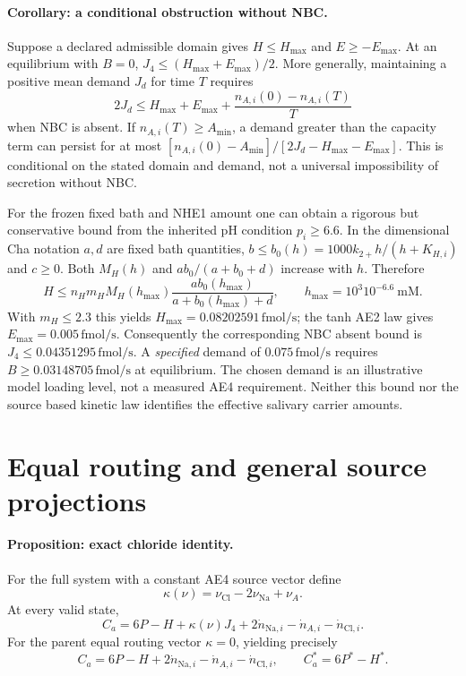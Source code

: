 \paragraph{Corollary: a conditional obstruction without NBC.}
Suppose a declared admissible domain gives $H\leq H_{\max}$ and
$E\geq-E_{\max}$.  At an equilibrium with $B=0$,
$J_4\leq(H_{\max}+E_{\max})/2$.  More generally, maintaining a positive
mean demand $J_d$ for time $T$ requires
\[
 2J_d\leq H_{\max}+E_{\max}
      +\frac{n_{A,i}(0)-n_{A,i}(T)}{T}
\]
when NBC is absent.  If $n_{A,i}(T)\geq A_{\min}$, a demand greater than
the capacity term can persist for at most
$[n_{A,i}(0)-A_{\min}]/[2J_d-H_{\max}-E_{\max}]$.
This is conditional on the stated domain and demand, not a universal
impossibility of secretion without NBC.

For the frozen fixed bath and NHE1 amount one can obtain a rigorous but
conservative bound from the inherited pH condition $p_i\geq6.6$.
In the dimensional Cha notation $a,d$ are fixed bath quantities,
$b\leq b_0(h)=1000k_{2+}h/(h+K_{H,i})$ and $c\geq0$.
Both $M_H(h)$ and $ab_0/(a+b_0+d)$ increase with $h$.
Therefore
\[
 H\leq n_Hm_H M_H(h_{\max})
      \frac{ab_0(h_{\max})}{a+b_0(h_{\max})+d},
 \qquad h_{\max}=10^3 10^{-6.6}\ \mathrm{mM}.
\]
With $m_H\leq2.3$ this yields $H_{\max}=0.08202591\,\mathrm{fmol/s}$;
the tanh AE2 law gives $E_{\max}=0.005\,\mathrm{fmol/s}$.
Consequently the corresponding NBC absent bound is
$J_4\leq0.04351295\,\mathrm{fmol/s}$.  A \emph{specified} demand of
$0.075\,\mathrm{fmol/s}$ requires
$B\geq0.03148705\,\mathrm{fmol/s}$ at equilibrium.
The chosen demand is an illustrative model loading level, not a measured
AE4 requirement.  Neither this bound nor the source based kinetic law
identifies the effective salivary carrier amounts.

\section{Equal routing and general source projections}
\label{sec:source-proof}
\paragraph{Proposition: exact chloride identity.}
For the full system with a constant AE4 source vector define
\[
 \kappa(\nu)=\nu_{\mathrm{Cl}}-2\nu_{\mathrm{Na}}+\nu_A.
\]
At every valid state,
\begin{equation}
 C_a=6P-H+\kappa(\nu)J_4
            +2\dot n_{\mathrm{Na},i}-\dot n_{A,i}-\dot n_{\mathrm{Cl},i}.
 \label{eq:general-chloride-identity}
\end{equation}
For the parent equal routing vector $\kappa=0$, yielding precisely
\[
 C_a=6P-H+2\dot n_{\mathrm{Na},i}-\dot n_{A,i}-\dot n_{\mathrm{Cl},i},
 \qquad C_a^*=6P^*-H^*.
\]

